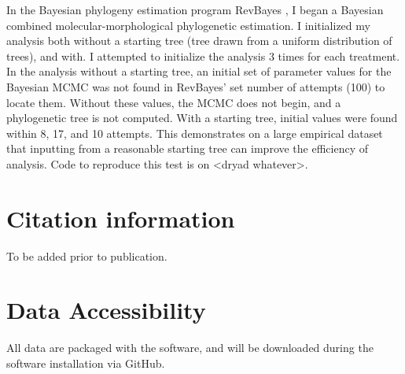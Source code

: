 In the Bayesian phylogeny estimation program RevBayes \citep{revbayes}, I began a Bayesian combined molecular-morphological phylogenetic estimation. 
I initialized my analysis both without a starting tree (tree drawn from a uniform distribution of trees), and with.
I attempted to initialize the analysis 3 times for each treatment.
In the analysis without a starting tree, an initial set of parameter values for the Bayesian MCMC was not found in RevBayes' set number of attempts (100) to locate them.
Without these values, the MCMC does not begin, and a phylogenetic tree is not computed. 
With a starting tree, initial values were found within 8, 17, and 10 attempts. 
This demonstrates on a large empirical dataset that inputting from a reasonable starting tree can improve the efficiency of analysis. 
Code to reproduce this test is on <dryad whatever>. \par


\section{Citation information}

To be added prior to publication.
 
\section{Data Accessibility}

All data are packaged with the software, and will be downloaded during the software installation via GitHub.